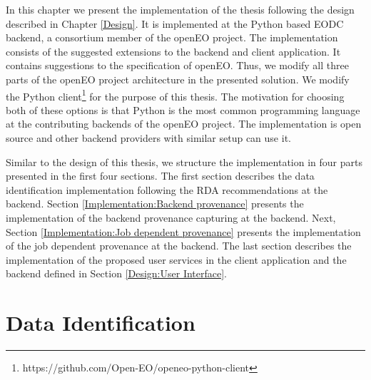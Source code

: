 \documentclass[draft,final]{vutinfth} %
\newcommand{\bgoesswein}[1]{{\color{blue}#1}}
\newcommand{\bgoessweindel}[1]{{\color{red}#1}}
\begin{document}

In this chapter we present the \bgoesswein{implementation} of the thesis following the design described in Chapter \ref{Design}. It is implemented at the Python based EODC backend, a consortium member of the openEO project. The implementation consists of the suggested extensions to the backend and client application. It contains suggestions to the specification of openEO. Thus, we modify all three parts of the openEO project architecture in the presented solution. We modify the Python client\footnote{https://github.com/Open-EO/openeo-python-client} for the purpose of this thesis. \bgoessweindel{The motivation for choosing both of these options is that} Python is the most common programming language at the contributing backends of the openEO project. The implementation is open source and other backend providers with similar setup can use it.  

Similar to the design of this thesis, we structure the implementation in four parts presented in the first four sections. The first section describes the data identification implementation following the RDA recommendations at the backend. Section \ref{Implementation:Backend provenance} presents the implementation of the backend provenance capturing at the backend. Next, Section \ref{Implementation:Job dependent provenance} presents the implementation of the job dependent provenance at the backend. The last section describes the implementation of the proposed user services in the client application and the backend defined in Section \ref{Design:User Interface}.     
\newpage
\section{Data Identification}\label{Implementation:Data Identification}
\end{document}
